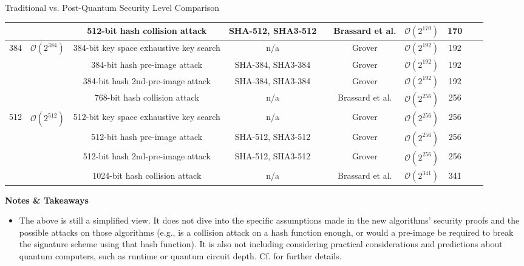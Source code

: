 \begin{algorithmbox}{Traditional vs. Post-Quantum Security Level Comparison \tbv}
\begin{center}
\begin{tabular}{cc|ccc|ccccc}
            &  & 512-bit hash collision attack & SHA-512, SHA3-512 &  & Brassard et al. & $\mathcal{O}\left(2^{170}\right)$ & 170 &  & \\
            \hline
            \multirow{4}{*}[-2.5mm]{384} & \multirow{4}{*}[-2.5mm]{$\mathcal{O}\left(2^{384}\right)$} & 384-bit key space exhaustive key search & n/a &  & Grover & $\mathcal{O}\left(2^{192}\right)$ & 192 &  & \\
            &  & 384-bit hash pre-image attack & SHA-384, SHA3-384 &  & Grover & $\mathcal{O}\left(2^{192}\right)$ & 192 &  & \\
            &  & 384-bit hash 2nd-pre-image attack & SHA-384, SHA3-384 &  & Grover & $\mathcal{O}\left(2^{192}\right)$ & 192 & & \\
            &  & 768-bit hash collision attack & n/a &  & Brassard et al. & $\mathcal{O}\left(2^{256}\right)$ & 256 &  & \\
            \hline
            \multirow{4}{*}[-2.5mm]{512} & \multirow{4}{*}[-2.5mm]{$\mathcal{O}\left(2^{512}\right)$} & 512-bit key space exhaustive key search & n/a &  & Grover & $\mathcal{O}\left(2^{256}\right)$ & 256 &  & \\
            &  & 512-bit hash pre-image attack & SHA-512, SHA3-512 &  & Grover & $\mathcal{O}\left(2^{256}\right)$ & 256 &  & \\
            &  & 512-bit hash 2nd-pre-image attack & SHA-512, SHA3-512 &  & Grover & $\mathcal{O}\left(2^{256}\right)$ & 256 & & \\
            &  & 1024-bit hash collision attack & n/a &  & Brassard et al. & $\mathcal{O}\left(2^{341}\right)$ & 341 &  & \\
            \hline
        \end{tabular}
    \end{center}
    {\bfseries Notes \& Takeaways}
    \normalfont
    \begin{itemize}
        \item The above is still a simplified view. It does not dive into the specific assumptions made in the new algorithms' security proofs and the possible attacks on those algorithms (e.g., is a collision attack on a hash function enough, or would a pre-image be required to break the signature scheme using that hash function). It is also not including considering practical considerations and predictions about quantum computers, such as runtime or quantum circuit depth. Cf.  for further details.

\end{itemize}
\end{algorithmbox}
